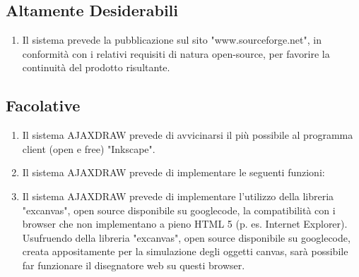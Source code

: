 \subsection{Altamente Desiderabili}
\begin{enumerate}
\item Il sistema prevede la pubblicazione sul sito "www.sourceforge.net", in conformit\`a con i relativi requisiti di natura open-source, per favorire la continuit\`a del prodotto risultante.
\end{enumerate}

\subsection{Facolative}
\begin{enumerate}
\item Il sistema AJAXDRAW prevede di avvicinarsi il pi\`u possibile al programma client (open e free) "Inkscape". 
\item Il sistema AJAXDRAW prevede di implementare le seguenti funzioni:


\item Il sistema  AJAXDRAW prevede di implementare l'utilizzo della libreria "excanvas", open source disponibile su googlecode, la compatibilit\`a con i browser che non implementano a pieno HTML 5 (p. es. Internet Explorer).
         Usufruendo della libreria "excanvas", open source disponibile su googlecode, creata appositamente per la simulazione degli oggetti canvas, sar\`a possibile far funzionare il disegnatore web su questi browser. 
\end{enumerate}


